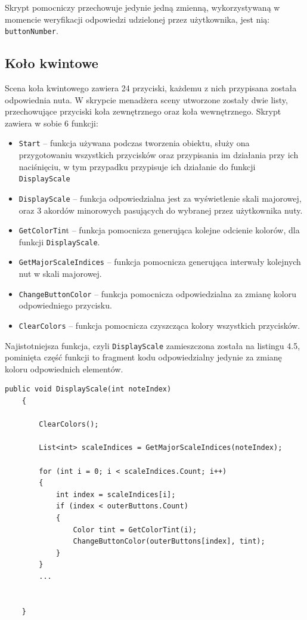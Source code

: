 Skrypt pomocniczy przechowuje jedynie jedną zmienną, wykorzystywaną w momencie weryfikacji odpowiedzi udzielonej przez użytkownika, jest nią: \texttt{buttonNumber}.

\subsection{Koło kwintowe}

Scena koła kwintowego zawiera 24 przyciski, każdemu z nich przypisana została odpowiednia nuta. W skrypcie menadżera sceny utworzone zostały dwie listy, przechowujące przyciski koła zewnętrznego oraz koła wewnętrznego. Skrypt zawiera w sobie 6 funkcji:

\begin{itemize}
\item \texttt{Start} -- funkcja używana podczas tworzenia obiektu, służy ona przygotowaniu wszystkich przycisków oraz przypisania im działania przy ich naciśnięciu, w tym przypadku przypisuje ich działanie do funkcji \texttt{DisplayScale}
\item \texttt{DisplayScale} -- funkcja odpowiedzialna jest za wyświetlenie skali majorowej, oraz 3 akordów minorowych pasujących do wybranej przez użytkownika nuty. 
\item \texttt{GetColorTin}t -- funkcja pomocnicza generująca kolejne odcienie kolorów, dla funkcji \texttt{DisplayScale}.
\item \texttt{GetMajorScaleIndices} -- funkcja pomocnicza generująca interwały kolejnych nut w skali majorowej.
\item \texttt{ChangeButtonColor} -- funkcja pomocnicza odpowiedzialna za zmianę koloru odpowiedniego przycisku.
\item \texttt{ClearColors} -- funkcja pomocnicza czyszcząca kolory wszystkich przycisków.
\end{itemize}

Najistotniejsza funkcja, czyli \texttt{DisplayScale} zamieszczona została na listingu 4.5, pominięta część funkcji to fragment kodu odpowiedzialny jedynie za zmianę koloru odpowiednich elementów.

\begin{lstlisting}[style=sharpcstyle,caption=Funkcja \texttt{DisplayScale}, label=lst:5]
    public void DisplayScale(int noteIndex)
    {

        ClearColors();

        List<int> scaleIndices = GetMajorScaleIndices(noteIndex);

        for (int i = 0; i < scaleIndices.Count; i++)
        {
            int index = scaleIndices[i];
            if (index < outerButtons.Count)
            {
                Color tint = GetColorTint(i);
                ChangeButtonColor(outerButtons[index], tint);
            }
        }
        ...
            
        
    }
\end{lstlisting}
